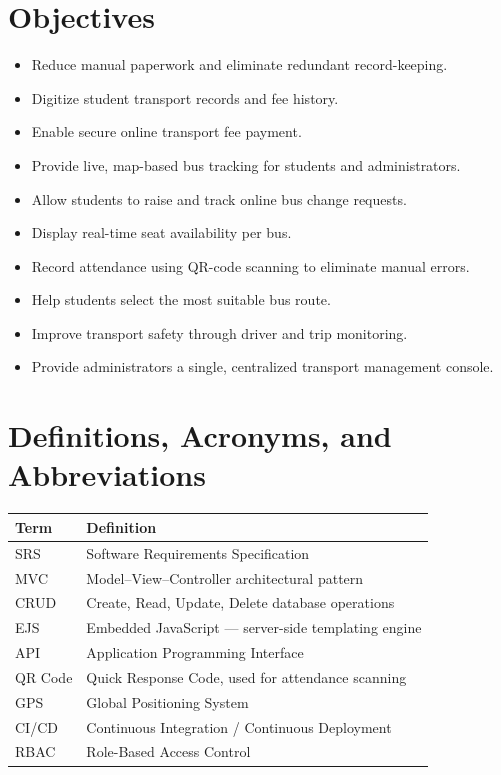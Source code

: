 \documentclass[11pt,a4paper]{report}
\begin{document}
\section{Objectives}
\begin{itemize}[leftmargin=1.3em]
  \item Reduce manual paperwork and eliminate redundant record-keeping.
  \item Digitize student transport records and fee history.
  \item Enable secure online transport fee payment.
  \item Provide live, map-based bus tracking for students and administrators.
  \item Allow students to raise and track online bus change requests.
  \item Display real-time seat availability per bus.
  \item Record attendance using QR-code scanning to eliminate manual errors.
  \item Help students select the most suitable bus route.
  \item Improve transport safety through driver and trip monitoring.
  \item Provide administrators a single, centralized transport management console.
\end{itemize}

\section{Definitions, Acronyms, and Abbreviations}
\begin{longtable}{@{}p{3.2cm}p{10.5cm}@{}}
\toprule
\rowcolor{pine!10}\textbf{Term} & \textbf{Definition} \\
\midrule
\endhead
SRS & Software Requirements Specification \\
MVC & Model--View--Controller architectural pattern \\
CRUD & Create, Read, Update, Delete database operations \\
EJS & Embedded JavaScript --- server-side templating engine \\
API & Application Programming Interface \\
QR Code & Quick Response Code, used for attendance scanning \\
GPS & Global Positioning System \\
CI/CD & Continuous Integration / Continuous Deployment \\
RBAC & Role-Based Access Control \\
\bottomrule
\end{longtable}
\end{document}
